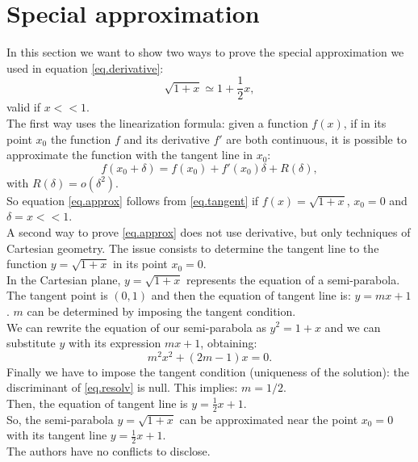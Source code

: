 \documentclass[11pt, oneside,reqno]{amsart}
\begin{document}
\section{Special approximation}
In this section we want to show two ways to prove the special approximation we used in equation \eqref{eq.derivative}: 
\begin{equation}\label{eq.approx}
    \sqrt{1+x} \simeq 1 + \frac{1}{2}x,
\end{equation}
valid if $x<<1$.\\
The first way uses the linearization formula: given a function $f(x)$,  if in its point $x_0$ the function $f$ and its derivative $f'$ are both continuous, it is possible to approximate the function with the tangent line in $x_0$:
\begin{equation}\label{eq.tangent}
    f(x_0+\delta) = f(x_0) + f'(x_0)\delta + R(\delta),
\end{equation}
with $R(\delta) = o(\delta^2)$.\\
So equation \eqref{eq.approx} follows from \eqref{eq.tangent} if $f(x) = \sqrt{1+x}$, $x_0 = 0$ and $\delta = x << 1$.\\
A second way to prove \eqref{eq.approx} does not use derivative, but only techniques of Cartesian geometry. The issue consists to determine the tangent line to the function $y=\sqrt{1+x}$ in its point $x_0=0$.\\
In the Cartesian plane, $y=\sqrt{1+x}$ represents the equation of a semi-parabola. The tangent point is $(0, 1)$ and then the equation of tangent line is: $y=mx+1$. $m$ can be determined by imposing the tangent condition.\\
We can rewrite the equation of our semi-parabola as $y^2=1+x$ and we can substitute $y$ with its expression $mx+1$, obtaining:
\begin{equation}\label{eq.resolv}
    m^2x^2+(2m-1)x=0.
\end{equation}
Finally we have to impose the tangent condition (uniqueness of the solution): the discriminant of \eqref{eq.resolv} is null. This implies: $m=1/2$.\\
Then, the equation of tangent line is $y=\frac{1}{2}x+1$.\\
So, the semi-parabola $y=\sqrt{1+x}$ can be approximated near the point $x_0=0$ with its tangent line $y=\frac{1}{2}x+1$.\\


The authors have no conflicts to disclose.

\end{document}

